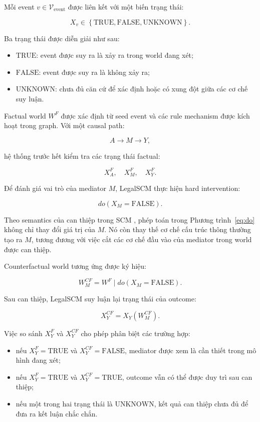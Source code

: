 Mỗi event \(v \in \mathcal{V}_{\mathrm{event}}\) được liên kết với một biến
trạng thái:

\begin{equation}
X_v
\in
\left\{
    \mathrm{TRUE},
    \mathrm{FALSE},
    \mathrm{UNKNOWN}
\right\}.
\end{equation}

Ba trạng thái được diễn giải như sau:

\begin{itemize}
    \item \(\mathrm{TRUE}\): event được suy ra là xảy ra trong world đang
    xét;
    \item \(\mathrm{FALSE}\): event được suy ra là không xảy ra;
    \item \(\mathrm{UNKNOWN}\): chưa đủ căn cứ để xác định hoặc có xung đột
    giữa các cơ chế suy luận.
\end{itemize}

Factual world \(W^{F}\) được xác định từ seed event và các rule mechanism
được kích hoạt trong graph. Với một causal path:

\[
A \rightarrow M \rightarrow Y,
\]

hệ thống trước hết kiểm tra các trạng thái factual:

\[
X_A^{F},\quad X_M^{F},\quad X_Y^{F}.
\]

Để đánh giá vai trò của mediator \(M\), LegalSCM thực hiện hard
intervention:

\begin{equation}
do
\left(
    X_M = \mathrm{FALSE}
\right).
\label{eq:do}
\end{equation}

Theo semantics của can thiệp trong SCM
\cite{pearl2009causality}, phép toán trong
Phương trình~\ref{eq:do} không chỉ thay đổi giá trị của \(M\). Nó còn thay
thế cơ chế cấu trúc thông thường tạo ra \(M\), tương đương với việc cắt các
cơ chế đầu vào của mediator trong world được can thiệp.

Counterfactual world tương ứng được ký hiệu:

\[
W^{CF}_{M}
=
W^{F}
\mid
do
\left(
    X_M = \mathrm{FALSE}
\right).
\]

Sau can thiệp, LegalSCM suy luận lại trạng thái của outcome:

\[
X_Y^{CF}
=
X_Y
\left(
    W^{CF}_{M}
\right).
\]

Việc so sánh \(X_Y^{F}\) và \(X_Y^{CF}\) cho phép phân biệt các trường hợp:

\begin{itemize}
    \item nếu
    \(X_Y^{F}=\mathrm{TRUE}\) và
    \(X_Y^{CF}=\mathrm{FALSE}\),
    mediator được xem là cần thiết trong mô hình đang xét;

    \item nếu
    \(X_Y^{F}=\mathrm{TRUE}\) và
    \(X_Y^{CF}=\mathrm{TRUE}\),
    outcome vẫn có thể được duy trì sau can thiệp;

    \item nếu một trong hai trạng thái là
    \(\mathrm{UNKNOWN}\),
    kết quả can thiệp chưa đủ để đưa ra kết luận chắc chắn.
\end{itemize}

